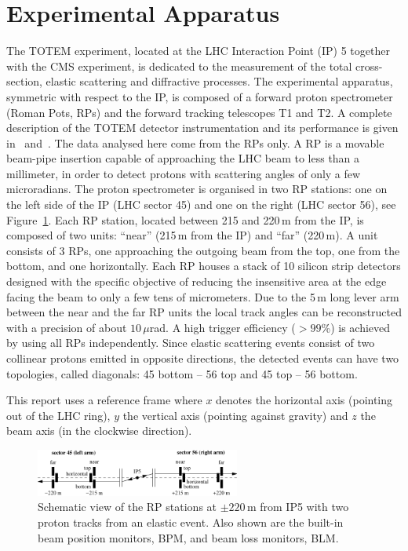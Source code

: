 \section{Experimental Apparatus}
\label{sec:exp apparatus}

The TOTEM experiment, located at the LHC Interaction Point (IP) 5 together with
the CMS experiment, is dedicated to the measurement of the total 
cross-section, elastic scattering
and diffractive processes. The experimental
apparatus, symmetric with respect to the IP, is 
composed of a forward proton spectrometer (Roman Pots, RPs) and the 
forward tracking telescopes T1 and T2. 
A complete description of the TOTEM detector instrumentation 
and its performance is given in~\cite{totem-jinst} and~\cite{totem-ijmp}. 
The data analysed here come from the RPs only. A RP is a movable beam-pipe
insertion capable of approaching the LHC beam to less than a millimeter, in 
order to detect protons with scattering angles of only a few microradians. 
The proton spectrometer is organised in two RP stations: one on the left side of the IP 
(LHC sector 45) and one on the right (LHC sector 56), see Figure~\ref{fig:rpsketch}.
Each RP station, located between 215 and 220\,m from the IP, is composed of two 
units: ``near'' (215\,m from the IP) and ``far'' (220\,m). 
A unit consists of 3 RPs, one
approaching the outgoing beam from the top, one from the bottom, and one 
horizontally.
Each RP houses a stack of 10 silicon
strip detectors designed with the specific objective of
reducing the insensitive area at the edge facing the beam
to only a few tens of micrometers. Due to the 5\,m long lever arm 
between the near and the far RP units 
the local track angles can be reconstructed
with a precision of about $10\,\mu$rad. A high trigger efficiency
($> 99$\%) is achieved by using all RPs independently. 
Since elastic scattering events consist of two collinear protons emitted in 
opposite directions, the detected events can have two topologies, called 
diagonals: 45 bottom -- 56 top and 45 top -- 56 bottom.

This report uses a reference frame where $x$ denotes the horizontal axis (pointing out of the LHC ring), $y$ the vertical axis (pointing against gravity) and $z$ the beam axis (in the clockwise direction).

\begin{figure}
\begin{center}
\includegraphics[width=0.6\textwidth]{fig/elastic_principle.pdf}
\caption{%
Schematic view of the RP stations at $\pm220\,$m from IP5 with two proton tracks from an elastic event. Also shown are the built-in beam position monitors, BPM, and beam loss monitors, BLM.
}
\label{fig:rpsketch}
\end{center}
\end{figure}
